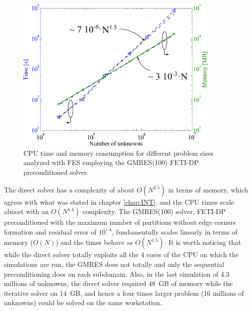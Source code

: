\begin{figure}[h!]
\centering
\includegraphics[width=10cm]{IterCompl}
\caption{CPU time and memory consumption for different problem sizes analyzed with FES employing the GMRES(100) FETI-DP preconditioned solver.}
\label{fig:IterCompl}
\end{figure}

The direct solver has a complexity of about $O(N^{2.5})$ in terms of memory, which agrees with what was stated in chapter \ref{chap:INT}, and the CPU times scale almost with an $O(N^{1.4})$ complexity. The GMRES(100) solver, FETI-DP preconditioned with the maximum number of partitions without edge corners formation and residual error of $10^{-4}$, fundamentally scales linearly in terms of memory ($O(N)$) and the times behave as $O(N^{1.5})$. It is worth noticing that while the direct solver totally exploits all the 4 cores of the CPU on which the simulations are run, the GMRES does not totally and only the sequential preconditioning does on each subdomain. Also, in the last simulation of 4.3 millions of unknowns, the direct solver required 48~GB of memory while the iterative solver on 14~GB, and hence a four times larger problem (16 millions of unknowns) could be solved on the same workstation.

